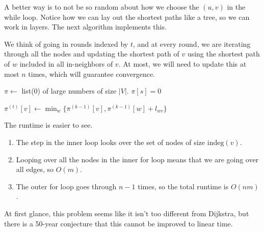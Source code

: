 \documentclass{article}
\begin{document}
    A better way is to not be so random about how we choose the $(u, v)$ in the while loop. Notice how we can lay out the shortest paths like a tree, so we can work in layers. The next algorithm implements this. 

    \begin{algo}
      We think of going in rounds indexed by $t$, and at every round, we are iterating through all the nodes and updating the shortest path of $v$ using the shortest path of $w$ included in all in-neighbors of $v$. At most, we will need to update this at most $n$ times, which will guarantee convergence.  
      \begin{algorithm}[H]
        \label{alg:bellman_ford}
        \begin{algorithmic}[1]
          \State $\pi \gets$ list(0) of large numbers of size $|V|$. 
          \State $\pi[s] = 0$

                \State $\pi^{(t)} [v] \gets \min_w \{ \pi^{(k-1)} [v], \pi^{(k-1)}[w] + l_{wv}\}$
              \EndFor 
            \EndFor
          \EndFunction
        \end{algorithmic}
      \end{algorithm}
      The runtime is easier to see. 
      \begin{enumerate}
        \item The step in the inner loop looks over the set of nodes of size $\mathrm{indeg}(v)$. 
        \item Looping over all the nodes in the inner for loop means that we are going over all edges, so $O(m)$. 
        \item The outer for loop goes through $n-1$ times, so the total runtime is $O(nm)$. 
      \end{enumerate}
    \end{algo}

    At first glance, this problem seems like it isn't too different from Dijkstra, but there is a 50-year conjecture that this cannot be improved to linear time. 
\end{document}
